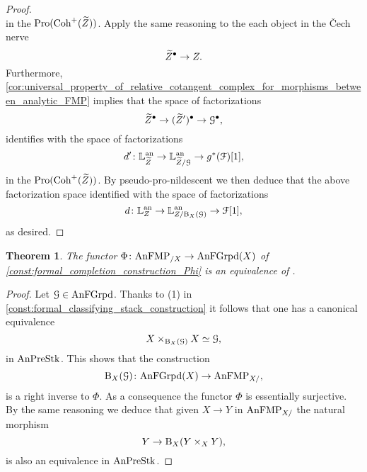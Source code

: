 \documentclass[10pt,a4paper,reqno]{amsart} %
\theoremstyle{plain}
\newtheorem{thm}{Theorem}[section]
\theoremstyle{definition}
\theoremstyle{remark}
\numberwithin{equation}{section}
\begin{document}
\begin{proof}
\[        \]
    in the \infcat $\mathrm{Pro}(\mathrm{Coh}^+(\widetilde Z))$. Apply the same reasoning to the each object in the \v{C}ech nerve
        \[
            \widetilde Z^\bullet \to Z.  
        \]
    Furthermore, \cref{cor:universal_property_of_relative_cotangent_complex_for_morphisms_between_analytic_FMP}
    implies that the space of factorizations
        \[
            \widetilde Z^\bullet \to (\widetilde Z')^\bullet \to \mathcal G^\bullet,  
        \]
    identifies with the space of factorizations
        \[
            d' \colon \mathbb L^\mathrm{an}_{\widetilde Z} \to \mathbb L^\mathrm{an}_{\widetilde Z/ \mathcal G} \to g^*(\mathcal F)[1],
        \]  
    in the \infcat $\mathrm{Pro}(\mathrm{Coh}^+(\widetilde Z))$. By pseudo-pro-nildescent we then deduce that the above factorization space identified with the space
    of factorizations
        \[
            d \colon \mathbb L^\mathrm{an}_Z \to \mathbb L^\mathrm{an}_{Z/ \mathrm B_X(\mathcal G)} \to \mathcal F[1],
        \]
    as desired.
\end{proof}

\begin{thm}
    The functor $\Phi \colon \mathrm{AnFMP}_{/X} \to \mathrm{AnFGrpd}(X)$ of \cref{const:formal_completion_construction_Phi} is an equivalence of \infcats.
\end{thm}

\begin{proof} Let $\mathcal G \in \mathrm{AnFGrpd}$.
    Thanks to (1) in \cref{const:formal_classifying_stack_construction} it follows that one has a canonical equivalence
        \[
            X \times_{\mathrm B_X(\mathcal G)} X \simeq \mathcal G,
        \]
    in $\mathrm{AnPreStk}$. This shows that the construction
        \[
            \mathrm B_X(\mathcal G) \colon \mathrm{AnFGrpd}(X) \to \mathrm{AnFMP}_{X/},  
        \]
    is a right inverse to $\Phi$. As a consequence the functor $\Phi$ is essentially surjective. By the same reasoning we deduce that
    given $X \to Y $ in $\mathrm{AnFMP}_{X/}$ the natural morphism
        \[
              Y \to \mathrm B_X(Y \times_X Y),
        \]
    is also an equivalence in $\mathrm{AnPreStk}$.
\end{proof}




\end{document}
